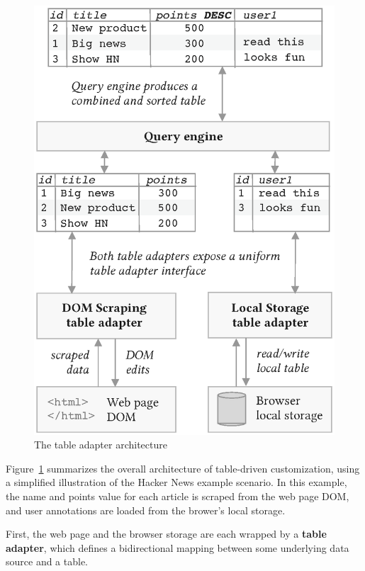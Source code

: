 \documentclass[sigplan,screen,10pt,anonymous,review]{acmart}
\begin{document}
\begin{figure}
\hypertarget{fig:table-adapter}{%
\centering
\includegraphics[width=\columnwidth]{media/table-adapter.eps}
\caption{The table adapter architecture}\label{fig:table-adapter}
}
\end{figure}

Figure~\ref{fig:table-adapter} summarizes the overall architecture of
table-driven customization, using a simplified illustration of the
Hacker News example scenario. In this example, the name and points value
for each article is scraped from the web page DOM, and user annotations
are loaded from the brower's local storage.

First, the web page and the browser storage are each wrapped by a
\textbf{table adapter}, which defines a bidirectional mapping between
some underlying data source and a table.
\end{document}
